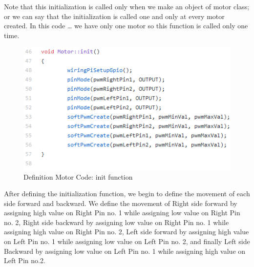 \newpage

Note that this initialization is called only when we make an object of motor class; or we can say that the initialization is called one and only at every motor created.  In this code … we have only one motor so this function is called only one time.

\begin{figure}[h]
    \centering
    \includegraphics{figures/62.png}
    \caption{Definition Motor Code: init function}
    \label{fig:my_label}
\end{figure}

\newpage
After defining the initialization function, we begin to define the movement of each side forward and backward. We define the movement of Right side forward by assigning high value on Right Pin no. 1 while assigning low value on Right Pin no. 2, Right side backward by assigning low value on Right Pin no. 1 while assigning high value on Right Pin no. 2, Left side forward by assigning high value on Left Pin no. 1 while assigning low value on Left Pin no. 2, and finally Left side Backward by assigning low value on Left Pin no. 1 while assigning high value on Left Pin no.2.


